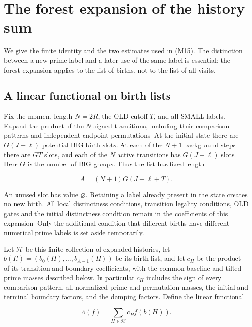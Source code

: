 \hypertarget{forest-moments}{%
\section{The forest expansion of the history sum}\label{forest-moments}}

We give the finite identity and the two estimates used in (M15). The
distinction between a new prime label and a later use of the same label
is essential: the forest expansion applies to the list of births, not to
the list of all visits.


\hypertarget{forest-moments-a-linear-functional-on-birth-lists}{%
\subsection{A linear functional on birth
lists}\label{forest-moments-a-linear-functional-on-birth-lists}}

Fix the moment length \(N=2R\), the OLD cutoff \(T\), and all SMALL
labels. Expand the product of the \(N\) signed transitions, including
their comparison patterns and independent endpoint permutations. At the
initial state there are \(G(J+\ell)\) potential BIG birth slots. At each
of the \(N+1\) background steps there are \(GT\) slots, and each of the
\(N\) active transitions has \(G(J+\ell)\) slots. Here \(G\) is the
number of BIG groups. Thus the list has fixed length

\[
A=(N+1)G(J+\ell+T).
\]

An unused slot has value \(\varnothing\). Retaining a label already
present in the state creates no new birth. All local distinctness
conditions, transition legality conditions, OLD gates and the initial
distinctness condition remain in the coefficients of this expansion.
Only the additional condition that different births have different
numerical prime labels is set aside temporarily.

Let \(\mathcal H\) be this finite collection of expanded histories, let
\(b(H)=(b_0(H),\ldots,b_{A-1}(H))\) be its birth list, and let \(c_H\)
be the product of its transition and boundary coefficients, with the
common baseline and tilted prime masses described below. In particular
\(c_H\) includes the sign of every comparison pattern, all normalized
prime and permutation masses, the initial and terminal boundary factors,
and the damping factors. Define the linear functional

\[
\Lambda(f)=\sum_{H\in\mathcal H}c_H f(b(H)). \tag{F3}
\]

